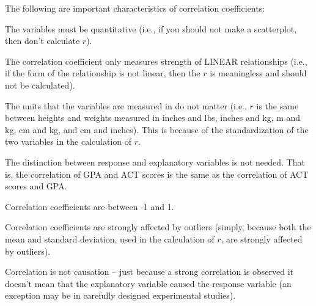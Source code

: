 \documentclass[10pt,openany]{book}\usepackage[]{graphicx}\usepackage[]{color}
\begin{document}


\begin{minipage}{\textwidth}
The following are important characteristics of correlation coefficients:
\begin{Itemize}
  \item The variables must be quantitative (i.e., if you should not make a scatterplot, then don't calculate $r$).
  \item The correlation coefficient only measures strength of LINEAR relationships (i.e., if the form of the relationship is not linear, then the $r$ is meaningless and should not be calculated).
  \item The units that the variables are measured in do not matter (i.e., $r$ is the same between heights and weights measured in inches and lbs, inches and kg, m and kg, cm and kg, and cm and inches).  This is because of the standardization of the two variables in the calculation of $r$.
  \item The distinction between response and explanatory variables is not needed.  That is, the correlation of GPA and ACT scores is the same as the correlation of ACT scores and GPA.
  \item Correlation coefficients are between -1 and 1.
  \item Correlation coefficients are strongly affected by outliers (simply, because both the mean and standard deviation, used in the calculation of $r$, are strongly affected by outliers).
  \item Correlation is not causation -- just because a strong correlation is observed it doesn't mean that the explanatory variable caused the response variable (an exception may be in carefully designed experimental studies).
\end{Itemize}
\end{minipage}

\end{document}
